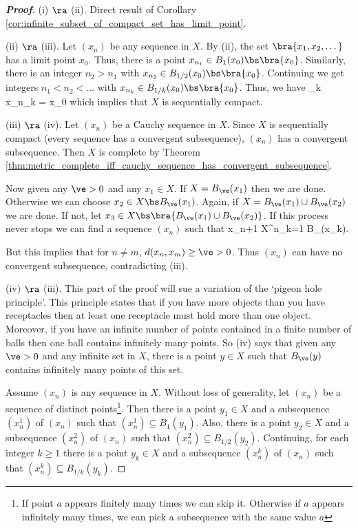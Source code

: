 \begin{proof}[\bf Proof]
(i) $\ra$ (ii). Direct result of Corollary \ref{cor:infinite_subset_of_compact_set_has_limit_point}.%

(ii) $\ra$ (iii). Let $(x_n)$ be any sequence in $X$. By (ii), the set $\bra{x_1,x_2,\dots}$ has a limit point $x_0$. Thus, there is a point $x_{n_1} \in B_1(x_0)\bs\bra{x_0}$. Similarly, there is an integer $n_2 > n_1$ with $x_{n_2}\in B_{1/2}(x_0)\bs\bra{x_0}$. Continuing we get integers $n_1 < n_2 < \dots$ with $x_{n_k} \in B_{1/k}(x_0)\bs\bra{x_0}$. Thus, we have
\be
\lim_{k\to \infty} x_{n_k} = x_0
\ee
which implies that $X$ is sequentially compact.

(iii) $\ra$ (iv). Let $(x_n)$ be a Cauchy sequence in $X$. Since $X$ is sequentially compact (every sequence has a convergent subsequence), $(x_n)$ has a convergent subsequence. Then $X$ is complete by Theorem \ref{thm:metric_complete_iff_cauchy_sequence_has_convergent_subsequence}.

Now given any $\ve>0$ and any $x_1\in X$. If $X = B_\ve(x_1)$ then we are done. Otherwise we can choose $x_2\in X\bs B_\ve(x_1)$. Again, if $X = B_\ve(x_1) \cup B_\ve(x_2)$ we are done. If not, let $x_3 \in X \bs \bra{B_\ve(x_1) \cup B_\ve(x_2)}$. If this process never stops we can find a sequence $(x_n)$ such that
\be
x_{n+1} \in X\left\bs \bigcup^n_{k=1} B_\ve(x_k)\right.
\ee

But this implies that for $n\neq m$, $d(x_n,x_m) \geq \ve >0$. Thus $(x_n)$ can have no convergent subsequence, contradicting (iii).

(iv) $\ra$ (iii). This part of the proof will sue a variation of the `pigeon hole principle'. This principle states that if you have more objects than you have receptacles then at least one receptacle must hold more than one object. Moreover, if you have an infinite number of points contained in a finite number of balls then one ball contains infinitely many points. So (iv) says that given any $\ve>0$ and any infinite set in $X$, there is a point $y\in X$ such that $B_\ve(y)$ contains infinitely many points of this set.

Assume $(x_n)$ is any sequence in $X$. Without loss of generality, let $(x_n)$ be a sequence of distinct points\footnote{If point $a$ appears finitely many times we can skip it. Otherwise if $a$ appears infinitely many times, we can pick a subsequence with the same value $a$}. Then there is a point $y_1\in X$ and a subsequence $(x_n^1)$ of $(x_n)$ such that $(x_n^1) \subseteq B_1(y_1)$. Also, there is a point $y_2\in X$ and a subsequence $(x_n^2)$ of $(x_n)$ such that $(x_n^2) \subseteq B_{1/2}(y_2)$. Continuing, for each integer $k\geq 1$ there is a point $y_k\in X$ and a subsequence $(x_n^k)$ of $(x_n)$ such that $(x_n^k) \subseteq B_{1/k}(y_k)$.


\end{proof}
